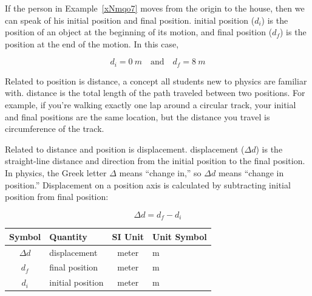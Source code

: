 \documentclass[main.tex]{subfiles}
\begin{document}
\solutionEnd    

\vspace{1em}




If the person in Example~\ref{xNmqo7} moves from the origin to the house, then we can speak of his initial position and final position. \Gls{initial position} ($d_i$) is the position of an object at the beginning of its motion, and \gls{final position} ($d_f$) is the position at the end of the motion. In this case,

\begin{equation*}
    d_i = \SI{0}{m} \hspace{1em} \text{and} \hspace{1em}
    d_f = \SI{8}{m}
\end{equation*}

\vspace{1ex}


Related to position is distance, a concept all students new to physics are familiar with. \Gls{distance} is the total length of the path traveled between two positions. For example, if you're walking exactly one lap around a circular track, your initial and final positions are the same location, but the distance you travel is circumference of the track. 

\vspace{1em}

Related to distance and position is displacement. \Gls{displacement} ($\Delta{d}$) is the straight-line distance and direction from the initial position to the final position. In physics, the Greek letter $\Delta$ means ``change in,'' so $\Delta d$ means ``change in position.'' Displacement on a position axis is calculated by subtracting initial position from final position:

\begin{equation} \label{DV73y9}
    \Delta{d} = d_f - d_i
\end{equation}

\begin{center}
    \begin{tabular}{cl|cl}
    \hline
    \textbf{Symbol} & \textbf{Quantity} & \textbf{SI Unit} & \textbf{Unit Symbol}  \\
    \hline\hline
        $\Delta{d}$ & displacement & meter & m\\
        $d_f$ & final position & meter & m \\
        $d_i$ & initial position & meter & m\\
    \hline
    \end{tabular}
\end{center}
\end{document}
